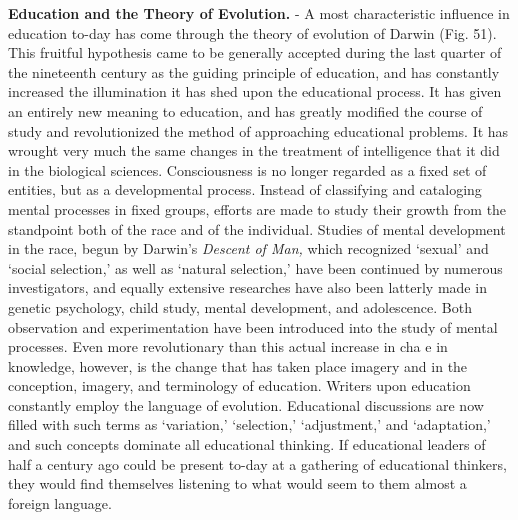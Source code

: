 \documentclass[]{book}
\begin{document}
\textbf{Education and the Theory of Evolution.} - A most characteristic influence in education to-day has come through the theory of evolution of Darwin (Fig. 51). This fruitful hypothesis came to be generally accepted during the last quarter of the nineteenth century as the guiding principle of education, and has constantly increased the illumination it has shed upon the educational process. It has given an entirely new meaning to education, and has greatly modified the course of study and revolutionized the method of approaching educational problems. It has wrought very much the same changes in the treatment of intelligence that it did in the biological sciences. Consciousness is no longer regarded as a fixed set of entities, but as a developmental process. Instead of classifying and cataloging mental processes in fixed groups, efforts are made to study their growth from the standpoint both of the race and of the individual. Studies of mental development in the race, begun by Darwin's \emph{Descent of Man,} which recognized `sexual' and `social selection,' as well as `natural selection,' have been continued by numerous investigators, and equally extensive researches have also been latterly made in genetic psychology, child study, mental development, and adolescence. Both observation and experimentation have been introduced into the study of mental processes. Even more revolutionary than this actual increase in cha e in knowledge, however, is the change that has taken place imagery and in the conception, imagery, and terminology of education. Writers upon education constantly employ the language of evolution. Educational discussions are now filled with such terms as `variation,' `selection,' `adjustment,' and `adaptation,' and such concepts dominate all educational thinking. If educational leaders of half a century ago could be present to-day at a gathering of educational thinkers, they would find themselves listening to what would seem to them almost a foreign language.
\end{document}
